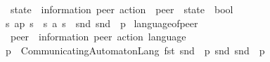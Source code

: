 \begin{isabellebody}
\ \ {\isacharcolon}{\kern0pt}{\isacharcolon}{\kern0pt}\ {\isachardoublequoteopen}{\isacharprime}{\kern0pt}state\ {\isasymRightarrow}\ {\isacharparenleft}{\kern0pt}{\isacharprime}{\kern0pt}information{\isacharcomma}{\kern0pt}\ {\isacharprime}{\kern0pt}peer{\isacharparenright}{\kern0pt}\ action\ {\isasymRightarrow}\ {\isacharprime}{\kern0pt}peer\ {\isasymRightarrow}\ {\isacharprime}{\kern0pt}state\ {\isasymRightarrow}\ bool{\isachardoublequoteclose}\isanewline
\ \ \ \ \ {\isacharparenleft}{\kern0pt}{\isachardoublequoteopen}{\isacharunderscore}{\kern0pt}\ {\isasymmidarrow}{\isacharunderscore}{\kern0pt}{\isasymrightarrow}{\isacharunderscore}{\kern0pt}\ {\isacharunderscore}{\kern0pt}{\isachardoublequoteclose}\ {\isacharbrackleft}{\kern0pt}{}{}{\isacharcomma}{\kern0pt}\ {}{}{\isacharcomma}{\kern0pt}\ {}{}{\isacharcomma}{\kern0pt}\ {}{}{\isacharbrackright}{\kern0pt}\ {}{}{}{\isacharparenright}{\kern0pt}\ \isanewline
\ \ {\isachardoublequoteopen}s{}\ {\isasymmidarrow}a{\isasymrightarrow}p\ s{}\ {\isasymequiv}\ {\isacharparenleft}{\kern0pt}s{}{\isacharcomma}{\kern0pt}\ a{\isacharcomma}{\kern0pt}\ s{}{\isacharparenright}{\kern0pt}\ {\isasymin}\ snd\ {\isacharparenleft}{\kern0pt}snd\ {\isacharparenleft}{\kern0pt}{\isasymA}\ p{\isacharparenright}{\kern0pt}{\isacharparenright}{\kern0pt}{\isachardoublequoteclose}\isanewline
\isanewline
{}\isamarkupfalse%
\ language{\isacharunderscore}{\kern0pt}of{\isacharunderscore}{\kern0pt}peer\isanewline
\ \ {\isacharcolon}{\kern0pt}{\isacharcolon}{\kern0pt}\ {\isachardoublequoteopen}{\isacharprime}{\kern0pt}peer\ {\isasymRightarrow}\ {\isacharparenleft}{\kern0pt}{\isacharprime}{\kern0pt}information{\isacharcomma}{\kern0pt}\ {\isacharprime}{\kern0pt}peer{\isacharparenright}{\kern0pt}\ action\ language{\isachardoublequoteclose}\ \ {\isacharparenleft}{\kern0pt}{\isachardoublequoteopen}{\isasymL}\ {\isacharunderscore}{\kern0pt}{\isachardoublequoteclose}\ {\isacharbrackleft}{\kern0pt}{}{}{\isacharbrackright}{\kern0pt}\ {}{}{}{\isacharparenright}{\kern0pt}\ \isanewline
\ \ {\isachardoublequoteopen}{\isasymL}{\isacharparenleft}{\kern0pt}p{\isacharparenright}{\kern0pt}\ {\isasymequiv}\ CommunicatingAutomaton{\isachardot}{\kern0pt}Lang\ {\isacharparenleft}{\kern0pt}fst\ {\isacharparenleft}{\kern0pt}snd\ {\isacharparenleft}{\kern0pt}{\isasymA}\ p{\isacharparenright}{\kern0pt}{\isacharparenright}{\kern0pt}{\isacharparenright}{\kern0pt}\ {\isacharparenleft}{\kern0pt}snd\ {\isacharparenleft}{\kern0pt}snd\ {\isacharparenleft}{\kern0pt}{\isasymA}\ p{\isacharparenright}{\kern0pt}{\isacharparenright}{\kern0pt}{\isacharparenright}{\kern0pt}{\isachardoublequoteclose}\isanewline

\end{isabellebody}
